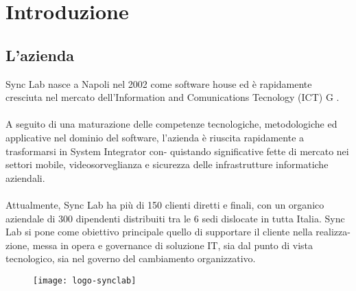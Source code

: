 
\chapter{Introduzione}
\label{cap:introduzione}





\section{L'azienda}

Sync Lab nasce a Napoli nel 2002 come software house ed è rapidamente cresciuta nel
mercato dell’Information and Comunications Tecnology (ICT) G . 
\\\\
A seguito di una
maturazione delle competenze tecnologiche, metodologiche ed applicative nel dominio
del software, l’azienda è riuscita rapidamente a trasformarsi in System Integrator con-
quistando significative fette di mercato nei settori mobile, videosorveglianza e sicurezza
delle infrastrutture informatiche aziendali. 
\\\\
Attualmente, Sync Lab ha più di 150 clienti
diretti e finali, con un organico aziendale di 300 dipendenti distribuiti tra le 6 sedi
dislocate in tutta Italia.
Sync Lab si pone come obiettivo principale quello di supportare il cliente nella realizza-
zione, messa in opera e governance di soluzione IT, sia dal punto di vista tecnologico,
sia nel governo del cambiamento organizzativo.

\begin{figure}[!h]
    \centering
    \texttt{[image: logo-synclab]}
\end{figure}

